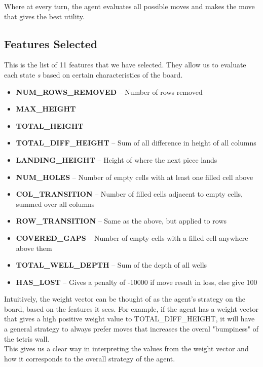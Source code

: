 \documentclass[a4paper,12pt,twocolumn]{article}
\begin{document}
Where at every turn, the agent evaluates all possible moves and makes the move
that gives the best utility.

\subsection{Features Selected}
\label{features_subsection}
This is the list of 11 features that we have selected. They allow us to
evaluate each state \textit{s} based on certain characteristics of the board.\\

\begin{itemize}
    \item \textbf{NUM\_ROWS\_REMOVED} -- Number of rows removed
    \item \textbf{MAX\_HEIGHT}
    \item \textbf{TOTAL\_HEIGHT}
    \item \textbf{TOTAL\_DIFF\_HEIGHT} -- Sum of all difference in height of all columns
    \item \textbf{LANDING\_HEIGHT} -- Height of where the next piece lands
    \item \textbf{NUM\_HOLES} -- Number of empty cells with at least one filled cell above
    \item \textbf{COL\_TRANSITION} -- Number of filled cells adjacent to empty cells,
        summed over all columns
    \item \textbf{ROW\_TRANSITION} -- Same as the above, but applied to rows
    \item \textbf{COVERED\_GAPS} -- Number of empty cells with a filled cell
        anywhere above them
    \item \textbf{TOTAL\_WELL\_DEPTH} -- Sum of the depth of all wells
    \item \textbf{HAS\_LOST} -- Gives a penalty of -10000 if move result in loss,
        else give 100
\end{itemize}

Intuitively, the weight vector can be thought of as the agent's strategy on
the board, based on the features it sees. For example, if the agent has a weight
vector that gives a high positive weight value to TOTAL\_DIFF\_HEIGHT, it will have
a general strategy to always prefer moves that increases the overal "bumpiness" of
the tetris wall.\\

This gives us a clear way in interpreting the values from the weight vector and how
it corresponds to the overall strategy of the agent.
\end{document}
